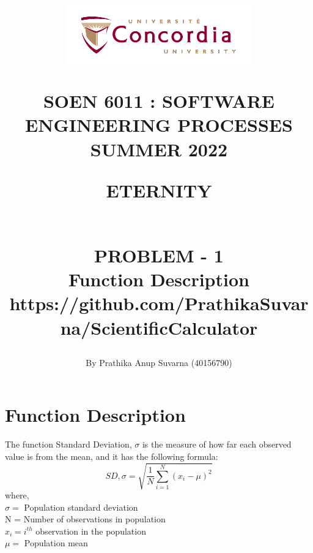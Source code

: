\documentclass[12pt,letterpaper]{report}
\begin{document}
\title{\begin{figure}[htb]
\begin{center}
\includegraphics[width=8cm]{univ_logo}
\end{center}
\end{figure}SOEN 6011 : SOFTWARE ENGINEERING PROCESSES\\[.5em]
SUMMER 2022\\\vspace*{0.9in}
\begin{Large}
\textbf{ETERNITY} 
\end{Large}
\vspace*{0.9in}
\begin{Large}
\textbf{\\PROBLEM - 1} 
\\Function Description \\
\small{https://github.com/PrathikaSuvarna/ScientificCalculator}
\end{Large}}
\author{By Prathika Anup Suvarna (40156790)}
\maketitle 
{}
\setcounter{page}{0}

\tableofcontents

\listoffigures{}


\chapter{Function Description}

\normalsize{The function Standard Deviation, $\sigma$ is the measure of how far each observed value is from the mean, and it has the following formula: \cite{definition} 
$$SD, \sigma = \sqrt{\frac{1}{N}\sum_{i=1}^{N}(x_i-\mu)^2}$$
where,\\$\sigma =$ Population standard deviation\\
N = Number of observations in population\\
$x_i = i^{th}$ observation in the population\\
$\mu =$ Population mean}
\end{document}

